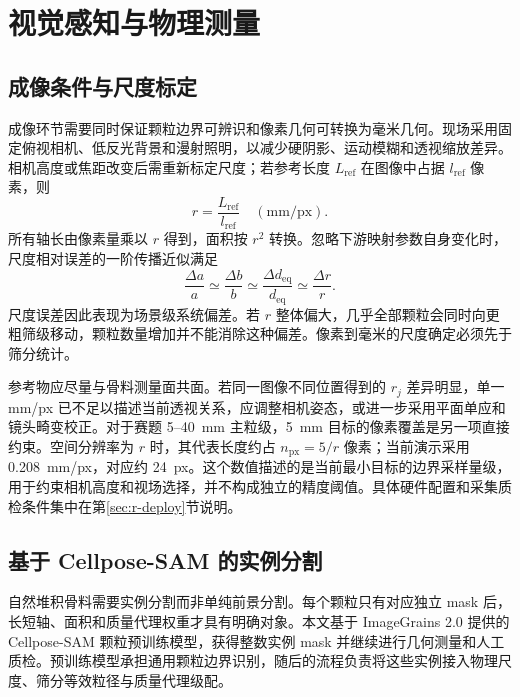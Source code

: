 \section{视觉感知与物理测量}
\label{sec:r-visual}

\subsection{成像条件与尺度标定}

成像环节需要同时保证颗粒边界可辨识和像素几何可转换为毫米几何。现场采用固定俯视相机、低反光背景和漫射照明，以减少硬阴影、运动模糊和透视缩放差异。相机高度或焦距改变后需重新标定尺度；若参考长度 $L_{\mathrm{ref}}$ 在图像中占据 $l_{\mathrm{ref}}$ 像素，则
\begin{equation}
 r=\frac{L_{\mathrm{ref}}}{l_{\mathrm{ref}}}\quad (\mathrm{mm/px}).
\label{eq:r-scale}
\end{equation}
所有轴长由像素量乘以 $r$ 得到，面积按 $r^2$ 转换。忽略下游映射参数自身变化时，尺度相对误差的一阶传播近似满足
\begin{equation}
\frac{\Delta a}{a}\simeq\frac{\Delta b}{b}\simeq\frac{\Delta d_{\mathrm{eq}}}{d_{\mathrm{eq}}}\simeq\frac{\Delta r}{r}.
\label{eq:r-scale-propagation}
\end{equation}
尺度误差因此表现为场景级系统偏差。若 $r$ 整体偏大，几乎全部颗粒会同时向更粗筛级移动，颗粒数量增加并不能消除这种偏差。像素到毫米的尺度确定必须先于筛分统计。

参考物应尽量与骨料测量面共面。若同一图像不同位置得到的 $r_j$ 差异明显，单一 mm/px 已不足以描述当前透视关系，应调整相机姿态，或进一步采用平面单应和镜头畸变校正。对于赛题 5--40~mm 主粒级，5~mm 目标的像素覆盖是另一项直接约束。空间分辨率为 $r$ 时，其代表长度约占 $n_{\mathrm{px}}=5/r$ 像素；当前演示采用 0.208~mm/px，对应约 24~px。这个数值描述的是当前最小目标的边界采样量级，用于约束相机高度和视场选择，并不构成独立的精度阈值。具体硬件配置和采集质检条件集中在第\ref{sec:r-deploy}节说明。

\subsection{基于 Cellpose-SAM 的实例分割}

自然堆积骨料需要实例分割而非单纯前景分割。每个颗粒只有对应独立 mask 后，长短轴、面积和质量代理权重才具有明确对象。本文基于 ImageGrains 2.0 提供的 Cellpose-SAM 颗粒预训练模型\cite{mair2026imagegrains2,pachitariu2025cellposeSAM}，获得整数实例 mask 并继续进行几何测量和人工质检。预训练模型承担通用颗粒边界识别，随后的流程负责将这些实例接入物理尺度、筛分等效粒径与质量代理级配。

